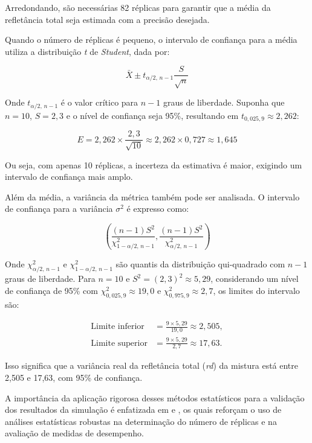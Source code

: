 \documentclass[
    12pt,                %
    openright,           %
    oneside,             %
    a4paper,             %
    english,             %
    spanish,             %
    brazil               %
]{ufscar}
\begin{document}
Arredondando, são necessárias 82 réplicas para garantir que a média da refletância total seja estimada com a precisão desejada.

Quando o número de réplicas é pequeno, o intervalo de confiança para a média utiliza a distribuição \textit{t} de \textit{Student}, dada por:

\begin{equation}
\bar{X} \pm t_{\alpha/2,\, n-1}\frac{S}{\sqrt{n}}
\label{eq:ci_t}
\end{equation}

Onde \(t_{\alpha/2,\, n-1}\) é o valor crítico para \(n-1\) graus de liberdade. Suponha que \(n = 10\), \(S = 2{,}3\) e o nível de confiança seja 95\%, resultando em \(t_{0,025,9} \approx 2{,}262\):

\begin{equation}
E = 2{,}262 \times \frac{2{,}3}{\sqrt{10}} \approx 2{,}262 \times 0{,}727 \approx 1{,}645
\end{equation}

Ou seja, com apenas 10 réplicas, a incerteza da estimativa é maior, exigindo um intervalo de confiança mais amplo.

Além da média, a variância da métrica também pode ser analisada. O intervalo de confiança para a variância \(\sigma^2\) é expresso como:

\begin{equation}
\left( \frac{(n-1)S^2}{\chi^2_{1-\alpha/2,\, n-1}}, \frac{(n-1)S^2}{\chi^2_{\alpha/2,\, n-1}} \right)
\label{eq:ci_variancia}
\end{equation}

Onde \(\chi^2_{\alpha/2,\, n-1}\) e \(\chi^2_{1-\alpha/2,\, n-1}\) são quantis da distribuição qui-quadrado com \(n-1\) graus de liberdade. Para \(n = 10\) e \(S^2 = (2{,}3)^2 \approx 5{,}29\), considerando um nível de confiança de 95\% com \(\chi^2_{0,025,9} \approx 19{,}0\) e \(\chi^2_{0,975,9} \approx 2{,}7\), os limites do intervalo são:

\begin{align}
\text{Limite inferior} &= \frac{9 \times 5{,}29}{19{,}0} \approx 2{,}505, \\
\text{Limite superior} &= \frac{9 \times 5{,}29}{2{,}7} \approx 17{,}63.
\end{align}

Isso significa que a variância real da refletância total (\textit{rd}) da mistura está entre 2,505 e 17,63, com 95\% de confiança.

A importância da aplicação rigorosa desses métodos estatísticos para a validação dos resultados da simulação é enfatizada em  e , os quais reforçam o uso de análises estatísticas robustas na determinação do número de réplicas e na avaliação de medidas de desempenho.
\end{document}

